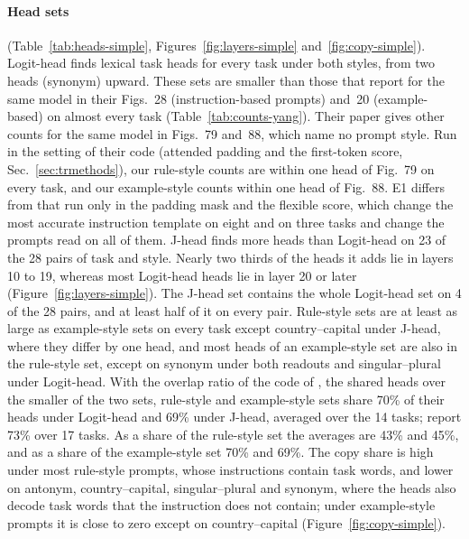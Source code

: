 \documentclass[11pt,a4paper]{article}
\begin{document}
\paragraph{Head sets} (Table~\ref{tab:heads-simple}, Figures~\ref{fig:layers-simple} and~\ref{fig:copy-simple}). Logit-head finds lexical task heads for every task under both styles, from two heads (synonym) upward. These sets are smaller than those that \citet{yang2026shared} report for the same model in their Figs.~28 (instruction-based prompts) and~20 (example-based) on almost every task (Table~\ref{tab:counts-yang}). Their paper gives other counts for the same model in Figs.~79 and~88, which name no prompt style. Run in the setting of their code (attended padding and the first-token score, Sec.~\ref{sec:trmethods}), our rule-style counts are within one head of Fig.~79 on every task, and our example-style counts within one head of Fig.~88. E1 differs from that run only in the padding mask and the flexible score, which change the most accurate instruction template on eight and on three tasks and change the prompts read on all of them. J-head finds more heads than Logit-head on 23 of the 28 pairs of task and style. Nearly two thirds of the heads it adds lie in layers 10 to 19, whereas most Logit-head heads lie in layer 20 or later (Figure~\ref{fig:layers-simple}). The J-head set contains the whole Logit-head set on 4 of the 28 pairs, and at least half of it on every pair. Rule-style sets are at least as large as example-style sets on every task except country--capital under J-head, where they differ by one head, and most heads of an example-style set are also in the rule-style set, except on synonym under both readouts and singular--plural under Logit-head. With the overlap ratio of the code of \citet{yang2026shared}, the shared heads over the smaller of the two sets, rule-style and example-style sets share 70\% of their heads under Logit-head and 69\% under J-head, averaged over the 14 tasks; \citet[Fig.~3]{yang2026shared} report 73\% over 17 tasks. As a share of the rule-style set the averages are 43\% and 45\%, and as a share of the example-style set 70\% and 69\%. The copy share is high under most rule-style prompts, whose instructions contain task words, and lower on antonym, country--capital, singular--plural and synonym, where the heads also decode task words that the instruction does not contain; under example-style prompts it is close to zero except on country--capital (Figure~\ref{fig:copy-simple}).
\end{document}
